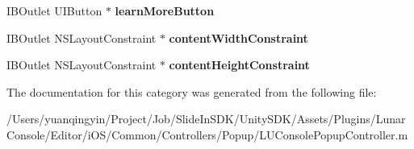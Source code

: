 \begin{DoxyCompactItemize}
I\+B\+Outlet U\+I\+Button $\ast$ {\bfseries learn\+More\+Button}
\item 
\mbox{\label{category_l_u_console_popup_controller_07_08_aa6e5ba082051e19dd2feb6b2fb0cb2d0}} 
I\+B\+Outlet N\+S\+Layout\+Constraint $\ast$ {\bfseries content\+Width\+Constraint}
\item 
\mbox{\label{category_l_u_console_popup_controller_07_08_a4305a67d4ac11cf674d46aac03920cfe}} 
I\+B\+Outlet N\+S\+Layout\+Constraint $\ast$ {\bfseries content\+Height\+Constraint}
\end{DoxyCompactItemize}


The documentation for this category was generated from the following file\+:\begin{DoxyCompactItemize}
\item 
/\+Users/yuanqingyin/\+Project/\+Job/\+Slide\+In\+S\+D\+K/\+Unity\+S\+D\+K/\+Assets/\+Plugins/\+Lunar\+Console/\+Editor/i\+O\+S/\+Common/\+Controllers/\+Popup/L\+U\+Console\+Popup\+Controller.\+m\end{DoxyCompactItemize}
